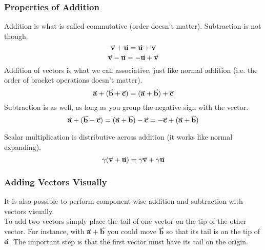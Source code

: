 \documentclass[main.tex]{subfiles}
\begin{document}
                \subsubsection{Properties of Addition}
                    \label{subsubsec: Properties of Addition}
                    Addition is what is called commutative (order doesn't matter). Subtraction is not though.
                    \begin{equation}
                        \vect{v} + \vect{u} = \vect{u} + \vect{v}
                    \end{equation}
                    \begin{equation}
                        \vect{v} - \vect{u} = -\vect{u} + \vect{v}
                    \end{equation}
                    Addition of vectors is what we call associative, just like normal addition (i.e. the order of bracket operations doesn't matter).
                    \begin{equation}
                        \vect{a} + (\vect{b} + \vect{c}) = (\vect{a} + \vect{b}) + \vect{c}
                        \label{eq: Associativity of Vector Addition}
                    \end{equation}
                    Subtraction is as well, as long as you group the negative sign with the vector.
                    \begin{equation}
                        \vect{a} + (\vect{b} - \vect{c}) = (\vect{a} + \vect{b}) - \vect{c} = -\vect{c} + (\vect{a} + \vect{b})
                    \end{equation}
                    

                    Scalar multiplication is distributive across addition (it works like normal expanding).
                    \begin{equation}
                        \gamma(\vect{v} + \vect{u}) = \gamma \vect{v} + \gamma \vect{u}
                    \end{equation}


                \subsubsection{Adding Vectors Visually}
                    \label{subsubsec: Adding Vectors Visually}

                    It is also possible to perform component-wise addition and subtraction with vectors visually.\\
                    To add two vectors simply place the tail of one vector on the tip of the other vector. For instance, with $\vect{a} + \vect{b}$ you could move $\vect{b}$ so that its tail is on the tip of $\vect{a}$. The important step is that the first vector must have its tail on the origin.
\end{document}
